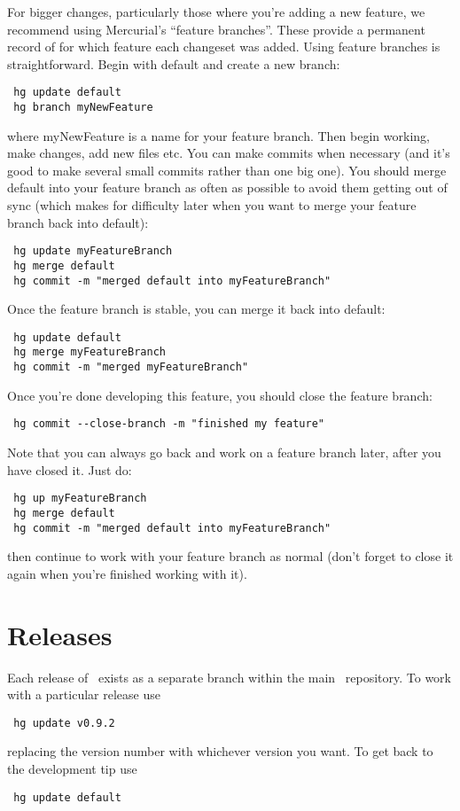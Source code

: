 For bigger changes, particularly those where you're adding a new feature, we recommend using Mercurial's ``feature branches''. These provide a permanent record of for which feature each changeset was added. Using feature branches is straightforward. Begin with {\normalfont \ttfamily default} and create a new branch:
\begin{verbatim}
 hg update default
 hg branch myNewFeature
\end{verbatim}
where {\normalfont \ttfamily myNewFeature} is a name for your feature branch. Then begin working, make changes, add new files etc. You can make commits when necessary (and it's good to make several small commits rather than one big one). You should merge {\normalfont \ttfamily default} into your feature branch as often as possible to avoid them getting out of sync (which makes for difficulty later when you want to merge your feature branch back into {\normalfont \ttfamily default}):
\begin{verbatim}
 hg update myFeatureBranch
 hg merge default
 hg commit -m "merged default into myFeatureBranch"
\end{verbatim}
Once the feature branch is stable, you can merge it back into {\normalfont \ttfamily default}:
\begin{verbatim}
 hg update default
 hg merge myFeatureBranch
 hg commit -m "merged myFeatureBranch"
\end{verbatim}
Once you're done developing this feature, you should close the feature branch:
\begin{verbatim}
 hg commit --close-branch -m "finished my feature"
\end{verbatim}
Note that you can always go back and work on a feature branch later, after you have closed it. Just do:
\begin{verbatim}
 hg up myFeatureBranch
 hg merge default
 hg commit -m "merged default into myFeatureBranch"
\end{verbatim}
then continue to work with your feature branch as normal (don't forget to close it again when you're finished working with it).

\section{Releases}

Each release of \glc\ exists as a separate branch within the main \glc\ repository. To work with a particular release use
\begin{verbatim}
 hg update v0.9.2
\end{verbatim}
replacing the version number with whichever version you want. To get back to the development tip use
\begin{verbatim}
 hg update default
\end{verbatim}

